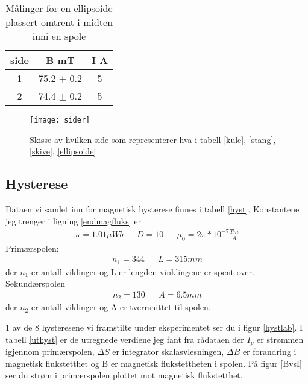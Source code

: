 \documentclass[norsk,a4paper,12pt]{article}
\begin{document}
\begin{table}[!h]
\begin{minipage}{.5\linewidth}
		\label{skive}
	\end{minipage}
	\hspace{.5cm}
	\begin{minipage}{.5\linewidth}
	\caption[Ellipsoide]{Målinger for en ellipsoide plassert omtrent i midten inni en spole}
	\centering
		\begin{tabular}{|c|c|c|}
		\hline
		side & B mT & I A\\
		\hline
		1 & 75.2 $\pm$ 0.2 & 5\\
		2 & 74.4 $\pm$ 0.2  & 5\\
		\hline
		\end{tabular}
		\label{ellipsoide}
	\end{minipage}
\end{table}

 \begin{figure}
	\begin{center}
  	\texttt{[image: sider]}\\
	\caption[Sidene til magnetene]{Skisse av hvilken side som representerer hva i tabell \ref{kule}, \ref{stang}, \ref{skive}, \vref{ellipsoide}}
	\label{sider}
	\end{center}
\end{figure}

\newpage
\subsection{Hysterese}
Dataen vi samlet inn for magnetisk hysterese finnes i tabell \vref{hyst}. Konstantene jeg trenger i ligning \ref{endmagfluks} er
\begin{align*}
\kappa = 1.01 \mu Wb && D = 10 && \mu_0 = 2\pi*10^{-7}\frac{Tm}{A}
\end{align*}
Primærspolen:
\begin{align*}
n_1 = 344 && L = 315 mm
\end{align*}
der $n_1$ er antall viklinger og L er lengden vinklingene er spent over.\\
Sekundærspolen
\begin{align*}
n_2 = 130 && A = 6.5 mm
\end{align*}
der $n_2$ er antall viklinger og A er tverrsnittet til spolen.

1 av de 8 hysteresene vi framstilte under eksperimentet ser du i figur \vref{hystlab}. I tabell \vref{uthyst} er de utregnede verdiene jeg fant fra rådataen der $I_p$ er strømmen igjennom primærspolen, $\Delta S$ er integrator skalasvlesningen, $\Delta B$ er forandring i magnetisk flukstetthet og B er magnetisk flukstettheten i spolen. På figur \vref{BvsI} ser du strøm i primærspolen plottet mot magnetisk flukstetthet. 
\end{document}
